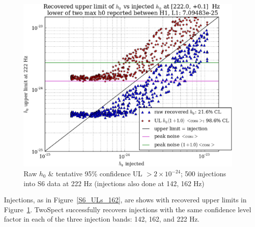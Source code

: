 \begin{figure}
\begin{center}
\includegraphics[width=0.5\paperwidth,height=0.35\paperheight]{plots/h0UL-vs-h0injected-222-0Hz.eps}
\caption{
Raw $h_0$ \& tentative 95\% confidence UL $>2\times10^{-24}$; 500 injections
into S6 data at 222 Hz (injections also done at 142, 162 Hz)}
\label{S6_ULs_222}
\end{center}
\end{figure}

Injections, as in Figure~\ref{S6_ULs_162}, are shows with recovered upper limits in Figure~\ref{S6_ULs_222}.
TwoSpect successfully recovers injections with the same confidence level factor in each of the three injection bands: 142, 162, and 222 Hz.





